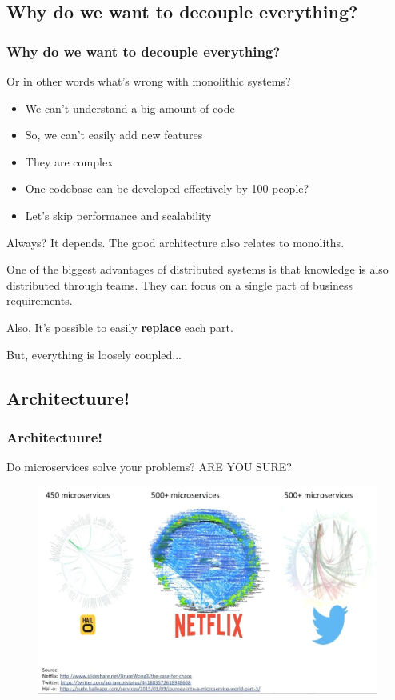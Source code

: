\subsection{Why do we want to decouple everything?}
\begin{frame}
\frametitle{Why do we want to decouple everything?}\pause
Or in other words what's wrong with monolithic systems?\pause
\begin{itemize}
	\item We can't understand a big amount of code\pause
	\item So, we can't easily add new features\pause
	\item They are complex\pause
	\item One codebase can be developed effectively by 100 people?\pause
	\item Let's skip performance and scalability
\end{itemize}
Always? It depends. The good architecture also relates to monoliths.
\end{frame}

\begin{frame}
One of the biggest advantages of distributed systems is that knowledge is
also distributed through teams. They can focus on a single part of
business requirements.

Also, It's possible to easily \textbf{replace} each part.
\end{frame}

\begin{frame}
But, everything is loosely coupled...
\end{frame}

\subsection{Architectuure!}
\begin{frame}
\frametitle{Architectuure!}
Do microservices solve your problems? ARE YOU SURE?
\begin{figure}
	\centering
	\includegraphics[width=1\linewidth]{pictures/exampleOfMicroservices}
	\label{fig:microservicesexamples}
\end{figure}


\end{frame}


